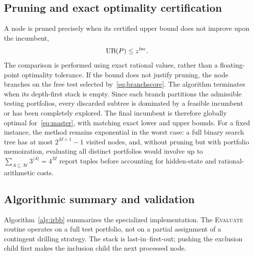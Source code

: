 \documentclass[11pt,a4paper]{article}
\newcommand{\calM}{\mathcal{M}}
\begin{document}
\subsection{Pruning and exact optimality certification}\label{sec:pruning}
A node is pruned precisely when its certified upper bound does not improve upon the incumbent,
\begin{equation}\label{eq:prune}
 \operatorname{UB}(P)\le z^{\rm inc}.
\end{equation}
The comparison is performed using exact rational values, rather than a floating-point optimality tolerance. If the bound does not justify pruning, the node branches on the free test selected by~\eqref{eq:branchscore}. The algorithm terminates when its depth-first stack is empty. Since each branch partitions the admissible testing portfolios, every discarded subtree is dominated by a feasible incumbent or has been completely explored. The final incumbent is therefore globally optimal for~\eqref{eq:master}, with matching exact lower and upper bounds. For a fixed instance, the method remains exponential in the worst case: a full binary search tree has at most $2^{M+1}-1$ visited nodes, and, without pruning but with portfolio memoization, evaluating all distinct portfolios would involve up to $\sum_{A\subseteq\calM}3^{|A|}=4^M$ report tuples before accounting for hidden-state and rational-arithmetic costs.

\subsection{Algorithmic summary and validation}\label{sec:summary}
Algorithm~\ref{alg:irbb} summarizes the specialized implementation. The \textsc{Evaluate} routine operates on a full test portfolio, not on a partial assignment of a contingent drilling strategy. The stack is last-in--first-out; pushing the exclusion child first makes the inclusion child the next processed node.
\end{document}

